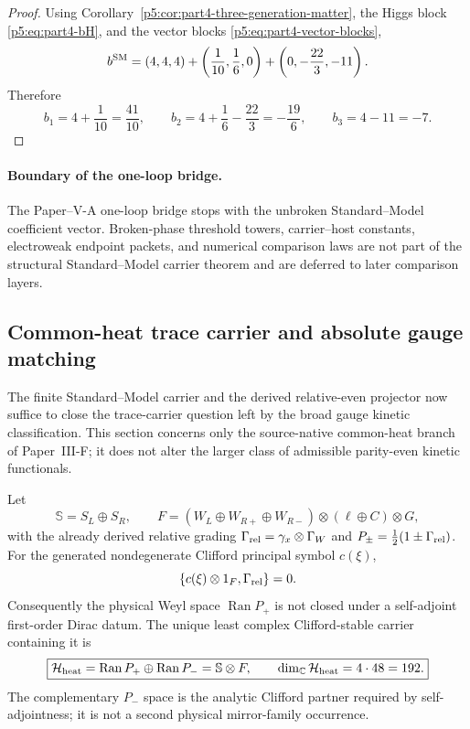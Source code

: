 \documentclass[12pt,a4paper]{article}
\begin{document}
\begin{proof}
Using Corollary~\ref{p5:cor:part4-three-generation-matter}, the Higgs block \eqref{p5:eq:part4-bH}, and the vector blocks \eqref{p5:eq:part4-vector-blocks},
\[
b^{\rm SM}=(4,4,4)+\left(\frac{1}{10},\frac16,0\right)+\left(0,-\frac{22}{3},-11\right).
\]
Therefore
\[
b_1=4+\frac{1}{10}=\frac{41}{10},\qquad b_2=4+\frac16-\frac{22}{3}=-\frac{19}{6},\qquad b_3=4-11=-7.
\]
\end{proof}


\paragraph{Boundary of the one-loop bridge.}
The Paper--V-A one-loop bridge stops with the unbroken Standard--Model coefficient vector.  Broken-phase threshold towers, carrier--host constants, electroweak endpoint packets, and numerical comparison laws are not part of the structural Standard--Model carrier theorem and are deferred to later comparison layers.

\subsection{Common-heat trace carrier and absolute gauge matching}
\label{p5:sec:common-heat-trace-carrier}

The finite Standard--Model carrier and the derived relative-even projector now
suffice to close the trace-carrier question left by the broad gauge kinetic
classification.  This section concerns only the source-native common-heat
branch of Paper~III-F; it does not alter the larger class of admissible
parity-even kinetic functionals.

\begin{theorem}
\label{p5:thm:least-self-adjoint-heat-carrier}
Let
\[
 \mathbb S=S_L\oplus S_R,
 \qquad
 F
 =(W_L\oplus W_{R+}\oplus W_{R-})\otimes(\ell\oplus C)\otimes G,
\]
with the already derived relative grading
$\Gamma_{\rm rel}=\gamma_x\otimes\Gamma_W$ and
$P_\pm=\tfrac12(1\pm\Gamma_{\rm rel})$.
For the generated nondegenerate Clifford principal symbol $c(\xi)$,
\[
 \{c(\xi)\otimes1_F,\Gamma_{\rm rel}\}=0.
\]
Consequently the physical Weyl space $\operatorname{Ran}P_+$ is not closed
under a self-adjoint first-order Dirac datum.  The unique least complex
Clifford-stable carrier containing it is
\[
 \boxed{
 \mathcal H_{\rm heat}
 =\operatorname{Ran}P_+\oplus\operatorname{Ran}P_-
 =\mathbb S\otimes F,
 \qquad
 \dim_{\mathbb C}\mathcal H_{\rm heat}=4\cdot48=192.}
\]
The complementary $P_-$ space is the analytic Clifford partner required by
self-adjointness; it is not a second physical mirror-family occurrence.
\end{theorem}
\end{document}
